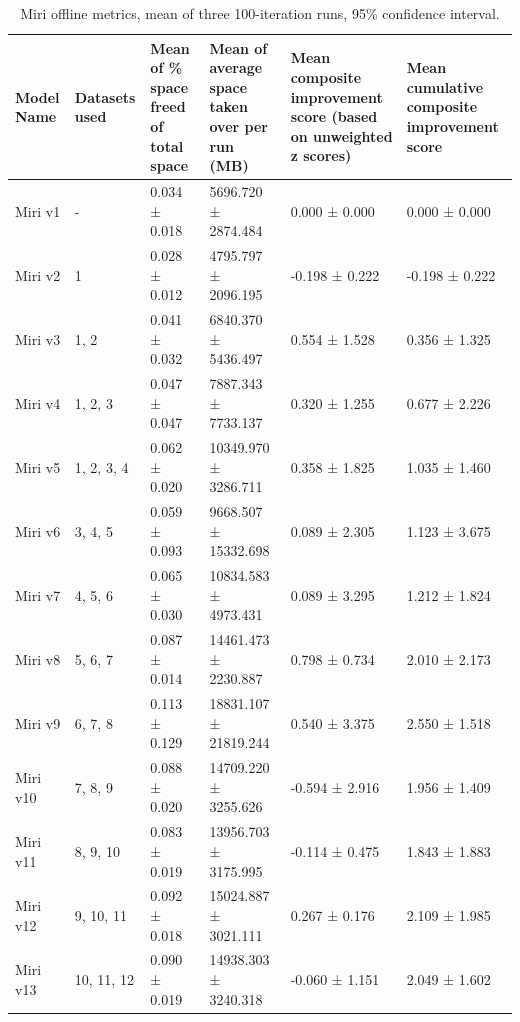 \documentclass{article}
\begin{document}
\begin{table}[H]
\centering
\setlength{\tabcolsep}{3pt}
\renewcommand{\arraystretch}{1.3}
\footnotesize
\begin{tabularx}{\textwidth}{|L|L|L|L|L|L|}
    \hline
    \textbf{Model Name} & 
    \textbf{Datasets used} & 
    \textbf{Mean of \% space freed of total space} & 
    \textbf{Mean of average space taken over per run (MB)} & 
    \textbf{Mean composite improvement score (based on unweighted z scores)} & 
    \textbf{Mean cumulative composite improvement score} \\ 
    \hline
    Miri v1 & - & 0.034 ± 0.018 & 5696.720 ± 2874.484 & 0.000 ± 0.000 & 0.000 ± 0.000 \\ 
    \hline
    Miri v2 & 1 & 0.028 ± 0.012 & 4795.797 ± 2096.195 & -0.198 ± 0.222 & -0.198 ± 0.222 \\ 
    \hline
    Miri v3 & 1, 2 & 0.041 ± 0.032 & 6840.370 ± 5436.497 & 0.554 ± 1.528 & 0.356 ± 1.325 \\ 
    \hline
    Miri v4 & 1, 2, 3 & 0.047 ± 0.047 & 7887.343 ± 7733.137 & 0.320 ± 1.255 & 0.677 ± 2.226 \\ 
    \hline
    Miri v5 & 1, 2, 3, 4 & 0.062 ± 0.020 & 10349.970 ± 3286.711 & 0.358 ± 1.825 & 1.035 ± 1.460 \\ 
    \hline
    Miri v6 & 3, 4, 5 & 0.059 ± 0.093 & 9668.507 ± 15332.698 & 0.089 ± 2.305 & 1.123 ± 3.675 \\ 
    \hline
    Miri v7 & 4, 5, 6 & 0.065 ± 0.030 & 10834.583 ± 4973.431 & 0.089 ± 3.295 & 1.212 ± 1.824 \\
    \hline
    Miri v8 & 5, 6, 7 & 0.087 ± 0.014 & 14461.473 ± 2230.887 & 0.798 ± 0.734 & 2.010 ± 2.173 \\
    \hline
    Miri v9 & 6, 7, 8 & 0.113 ± 0.129 & 18831.107 ± 21819.244 & 0.540 ± 3.375 & 2.550 ± 1.518 \\
    \hline
    Miri v10 & 7, 8, 9 & 0.088 ± 0.020 & 14709.220 ± 3255.626 & -0.594 ± 2.916 & 1.956 ± 1.409 \\
    \hline
    Miri v11 & 8, 9, 10 & 0.083 ± 0.019 & 13956.703 ± 3175.995 & -0.114 ± 0.475 & 1.843 ± 1.883 \\
    \hline
    Miri v12 & 9, 10, 11 & 0.092 ± 0.018 & 15024.887 ± 3021.111 & 0.267 ± 0.176 & 2.109 ± 1.985 \\
    \hline
    Miri v13 & 10, 11, 12 & 0.090 ± 0.019 & 14938.303 ± 3240.318 & -0.060 ± 1.151 & 2.049 ± 1.602 \\
    \hline
\end{tabularx}
\caption{Miri offline metrics, mean of three 100-iteration runs, 95\% confidence interval.}
\label{tab:miri_offline_metrics}
\end{table}
\end{document}
